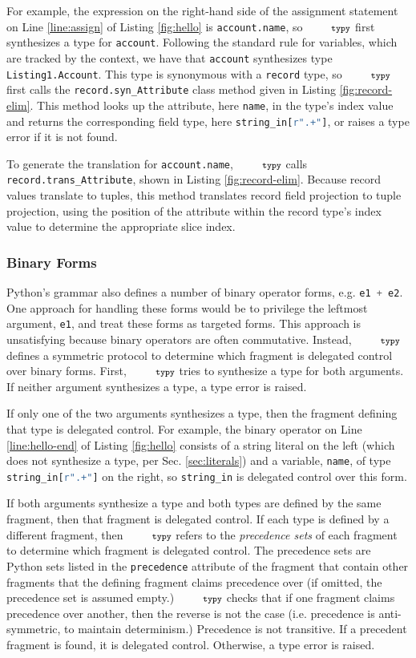 \documentclass[10pt]{sigplanconf}
\newcommand{\typy}{\texttt{\footnotesize typy}}
\newcommand{\lip}[1]{\lstinline[language=Python,basicstyle=\ttfamily\footnotesize,morekeywords={with},deletendkeywords={tuple,buffer,map}]{#1}}
\newcommand{\li}[1]{\lip{#1}}
\begin{document}
For example, the expression on the right-hand side of the assignment statement on Line \ref{line:assign} of Listing \ref{fig:hello} is \li{account.name}, so $\typy$ first synthesizes a type for \li{account}. Following the standard rule for variables, which are tracked by the context, we have that \li{account} synthesizes type \li{Listing1.Account}. This type is synonymous with a \li{record} type, so $\typy$ first calls the \li{record.syn_Attribute} class method given in Listing \ref{fig:record-elim}. This method looks up the attribute, here \li{name}, in the type's index value and returns the corresponding field type, here \li{string_in[r".+"]}, or raises a type error if it is not found.



To generate the translation for \li{account.name}, $\typy$ calls \li{record.trans_Attribute}, shown in Listing \ref{fig:record-elim}. Because record values translate to tuples, this method translates record field projection to tuple projection, using the position of the attribute within the record type's index value to determine the appropriate slice index.

\subsubsection{Binary Forms}\label{sec:binary-forms}

Python's grammar also defines a number of binary operator forms, e.g. \li{e1 + e2}. One approach for handling these forms would be to privilege the leftmost argument, \li{e1}, and treat these forms as targeted forms. This approach is unsatisfying because binary operators are often commutative. Instead, $\typy$ defines a symmetric protocol to determine which fragment is delegated control over binary forms. First, $\typy$ tries to synthesize a type for both arguments.
If neither argument synthesizes a type, a type error is raised. 

If only one of the two arguments synthesizes a type, then the fragment defining that type is delegated control. For example, the binary operator on Line \ref{line:hello-end} of Listing \ref{fig:hello} consists of a string literal on the left (which does not synthesize a type, per Sec. \ref{sec:literals}) and a variable, \li{name}, of type \li{string_in[r".+"]} on the right, so \li{string_in} is delegated control over this form.

If both arguments synthesize a type and both types are defined by the same fragment, then that fragment is delegated control. If each type is defined by a different fragment, then $\typy$ refers to the \emph{precedence sets} of each fragment to determine which fragment is delegated control. The precedence sets are Python sets listed in the \li{precedence} attribute of the fragment that contain other fragments that the defining fragment claims precedence over (if omitted, the precedence set is assumed empty.) $\typy$ checks that if one fragment claims precedence over another, then the reverse is not the case (i.e. precedence is anti-symmetric, to maintain determinism.) Precedence is not transitive. If a precedent fragment is found, it is delegated control. Otherwise, a type error is raised.%
\end{document}
